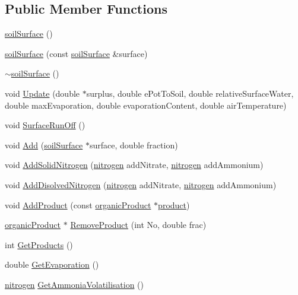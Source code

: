 \subsection*{Public Member Functions}
\begin{DoxyCompactItemize}
\item 
\hyperlink{classsoil_surface_a2a00df0b447ca767c659411db75ffaf4}{soilSurface} ()
\item 
\hyperlink{classsoil_surface_a972c99897a9210cabbc1d7c8403c91c7}{soilSurface} (const \hyperlink{classsoil_surface}{soilSurface} \&surface)
\item 
\hyperlink{classsoil_surface_a8bae6caa8bdbdd3893f861f72c15ea80}{$\sim$soilSurface} ()
\item 
void \hyperlink{classsoil_surface_a76aba92c277390cc78e28d056f0dbbaa}{Update} (double $\ast$surplus, double ePotToSoil, double relativeSurfaceWater, double maxEvaporation, double evaporationContent, double airTemperature)
\item 
void \hyperlink{classsoil_surface_aeb5d1da5eb1d80034c7293bf4442cbbd}{SurfaceRunOff} ()
\item 
void \hyperlink{classsoil_surface_a076f92fc689a98876883f657855fae06}{Add} (\hyperlink{classsoil_surface}{soilSurface} $\ast$surface, double fraction)
\item 
void \hyperlink{classsoil_surface_afef3d7ce9b27c8f12412031604133e9a}{AddSolidNitrogen} (\hyperlink{classnitrogen}{nitrogen} addNitrate, \hyperlink{classnitrogen}{nitrogen} addAmmonium)
\item 
void \hyperlink{classsoil_surface_a8ba8e112ccba970c09854d5abcc205b3}{AddDisolvedNitrogen} (\hyperlink{classnitrogen}{nitrogen} addNitrate, \hyperlink{classnitrogen}{nitrogen} addAmmonium)
\item 
void \hyperlink{classsoil_surface_af3935f9b1363a0eee0f46a5c26b7f115}{AddProduct} (const \hyperlink{classorganic_product}{organicProduct} $\ast$\hyperlink{classproduct}{product})
\item 
\hyperlink{classorganic_product}{organicProduct} $\ast$ \hyperlink{classsoil_surface_ab9ad1072ebafe753fdb342846877c8d7}{RemoveProduct} (int No, double frac)
\item 
int \hyperlink{classsoil_surface_a5945849d0991acc0b9d920659b681e21}{GetProducts} ()
\item 
double \hyperlink{classsoil_surface_a455a1094f28a710abb7fc1d88cae8c5d}{GetEvaporation} ()
\item 
\hyperlink{classnitrogen}{nitrogen} \hyperlink{classsoil_surface_aa6d131103f0277db0b8111fdf285d2ce}{GetAmmoniaVolatilisation} ()

\end{DoxyCompactItemize}
